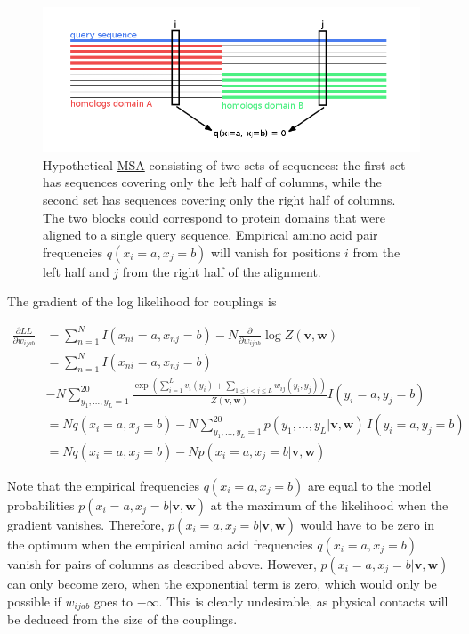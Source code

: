 \documentclass[12pt,a4paper,twoside]{book}
\newcommand{\eq}{\!=\!}
\renewcommand{\v}{\mathbf{v}}
\newcommand{\w}{\mathbf{w}}
\newcommand{\wijab}{w_{ijab}}
\theoremstyle{definition}
\theoremstyle{definition}
\theoremstyle{remark}
\begin{document}
\begin{figure}
\centering
\includegraphics{img/gap_treatment.png}
\caption{\label{fig:gap-treatment}Hypothetical \protect\hyperlink{abbrev}{MSA}
consisting of two sets of sequences: the first set has sequences
covering only the left half of columns, while the second set has
sequences covering only the right half of columns. The two blocks could
correspond to protein domains that were aligned to a single query
sequence. Empirical amino acid pair frequencies
\(q(x_i \eq a, x_j \eq b)\) will vanish for positions \(i\) from the
left half and \(j\) from the right half of the alignment.}
\end{figure}

The gradient of the log likelihood for couplings is

\begin{align}
\frac{\partial LL}{\partial \wijab} &= \sum_{n=1}^N I(x_{ni}=a, x_{nj}=b)  - N \frac{\partial}{\partial \wijab} \log Z(\v,\w) \\
                                        &= \sum_{n=1}^N I(x_{ni} \eq a, x_{nj} \eq b) \\
                                        & - N \sum_{y_1,\ldots,y_L=1}^{20} \!\! \frac{ \exp \left( \sum_{i=1}^L v_i(y_i) + \sum_{1 \le i < j \le L} w_{ij}(y_i,y_j) \right)}{Z(\v,\w)}  I(y_i \eq a, y_j \eq b) \\
                                        &=  N q(x_{i} \eq a, x_{j} \eq b) - N \sum_{y_1,\ldots,y_L=1}^{20} p(y_1, \ldots, y_L | \v,\w) \, I(y_i \eq a, y_j \eq b) \\
                                        &=  N q(x_{i} \eq a, x_{j} \eq b) - N p(x_i \eq a, x_j \eq b | \v,\w) 
\label{eq:gradient-LLreg-gaps-single}
\end{align}

Note that the empirical frequencies \(q(x_{i} \eq a, x_{j} \eq b)\) are
equal to the model probabilities \(p(x_i \eq a, x_j \eq b | \v,\w)\) at
the maximum of the likelihood when the gradient vanishes. Therefore,
\(p(x_i \eq a, x_j \eq b | \v, \w)\) would have to be zero in the
optimum when the empirical amino acid frequencies
\(q(x_i \eq a, x_j \eq b)\) vanish for pairs of columns as described
above. However, \(p(x_i \eq a, x_j \eq b | \v, \w)\) can only become
zero, when the exponential term is zero, which would only be possible if
\(\wijab\) goes to \(−\infty\). This is clearly undesirable, as physical
contacts will be deduced from the size of the couplings.
\end{document}
